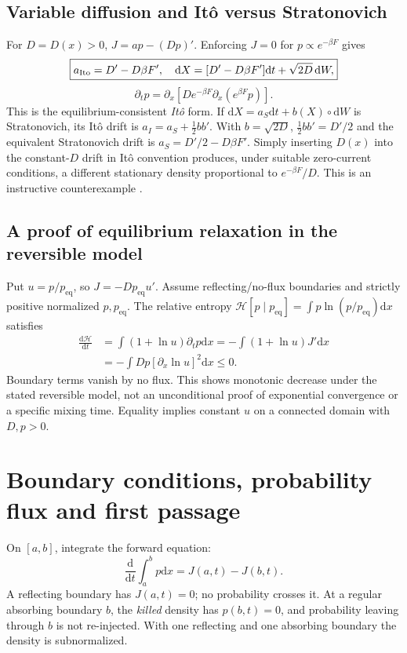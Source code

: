 \documentclass[11pt,a4paper]{article}
\newcommand{\dd}{\mathrm d}
\newcommand{\peq}{p_{\mathrm{eq}}}
\theoremstyle{remark}\newtheorem*{remark}{Physical interpretation}
\begin{document}
\subsection{Variable diffusion and It\^o versus Stratonovich}
For $D=D(x)>0$, $J=ap-(Dp)'$. Enforcing $J=0$ for $p\propto e^{-\beta F}$ gives
\begin{equation}\label{vard}\boxed{a_{\rm Ito}=D'-D\beta F',\quad
\dd X=[D'-D\beta F']\dd t+\sqrt{2D}\,\dd W,}\end{equation}
\begin{equation}\partial_t p=\partial_x\left[D e^{-\beta F}\partial_x(e^{\beta F}p)\right].\end{equation}
This is the equilibrium-consistent \emph{It\^o} form. If $\dd X=a_S\dd t+b(X)\circ\dd W$ is Stratonovich, its It\^o drift is $a_I=a_S+\frac12bb'$. With $b=\sqrt{2D}$, $\frac12bb'=D'/2$ and the equivalent Stratonovich drift is $a_S=D'/2-D\beta F'$. Simply inserting $D(x)$ into the constant-$D$ drift in It\^o convention produces, under suitable zero-current conditions, a different stationary density proportional to $e^{-\beta F}/D$. This is an instructive counterexample \cite{risken,gardiner}.

\subsection{A proof of equilibrium relaxation in the reversible model}
Put $u=p/\peq$, so $J=-D\peq u'$. Assume reflecting/no-flux boundaries and strictly positive normalized $p,\peq$. The relative entropy $\mathcal H[p\mid\peq]=\int p\ln(p/\peq)\dd x$ satisfies
\begin{align}\frac{\dd\mathcal H}{\dd t}
&=\int (1+\ln u)\partial_t p\dd x
=-\int (1+\ln u)J'\dd x\\
&=-\int Dp[\partial_x\ln u]^2\dd x\leq0.
\end{align}
Boundary terms vanish by no flux. This shows monotonic decrease under the stated reversible model, not an unconditional proof of exponential convergence or a specific mixing time. Equality implies constant $u$ on a connected domain with $D,p>0$.

\section{Boundary conditions, probability flux and first passage}
On $[a,b]$, integrate the forward equation:
\begin{equation}\frac{\dd}{\dd t}\int_a^b p\dd x=J(a,t)-J(b,t).\end{equation}
A reflecting boundary has $J(a,t)=0$; no probability crosses it. At a regular absorbing boundary $b$, the \emph{killed} density has $p(b,t)=0$, and probability leaving through $b$ is not re-injected. With one reflecting and one absorbing boundary the density is subnormalized.
\end{document}
